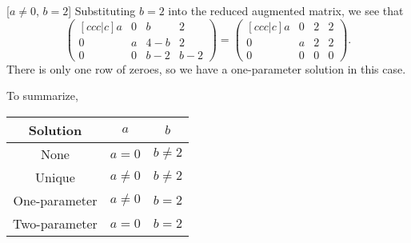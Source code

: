 \begin{solution}
    [$a \neq 0$, $b = 2$] Substituting $b = 2$ into the reduced augmented matrix, we see that \[\begin{pmatrix}[ccc|c]a & 0 & b & 2 \\ 0 & a & 4-b & 2 \\ 0 & 0 & b-2 & b-2\end{pmatrix} = \begin{pmatrix}[ccc|c]a & 0 & 2 & 2 \\ 0 & a & 2 & 2 \\ 0 & 0 & 0 & 0\end{pmatrix}.\] There is only one row of zeroes, so we have a one-parameter solution in this case.

    To summarize,
    \begin{table}[H]
        \centering
        \begin{tabular}{|c|c|c|}
            \hline
            \textbf{Solution} & $a$ & $b$ \\ \hline\hline
            None & $a = 0$ & $b \neq 2$ \\ \hline
            Unique & $a \neq 0$ & $b \neq 2$ \\ \hline
            One-parameter & $a \neq 0$ & $b = 2$ \\ \hline
            Two-parameter & $a = 0$ & $b = 2$\\ \hline
        \end{tabular}
    \end{table}
\end{solution}

